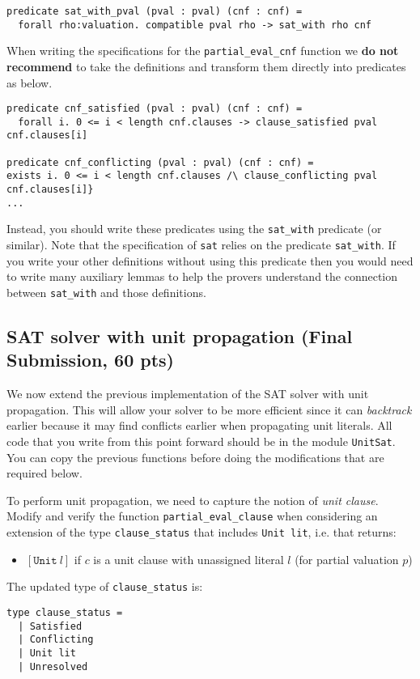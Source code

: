 \documentclass[11pt]{article}
\begin{document}
\begin{lstlisting}
predicate sat_with_pval (pval : pval) (cnf : cnf) =
  forall rho:valuation. compatible pval rho -> sat_with rho cnf
\end{lstlisting}

When writing the specifications for the \texttt{partial\_eval\_cnf} function we \textbf{do not recommend} to take the definitions and transform them directly into predicates as below.

\begin{lstlisting}
predicate cnf_satisfied (pval : pval) (cnf : cnf) = 
  forall i. 0 <= i < length cnf.clauses -> clause_satisfied pval cnf.clauses[i] 

predicate cnf_conflicting (pval : pval) (cnf : cnf) = 
exists i. 0 <= i < length cnf.clauses /\ clause_conflicting pval cnf.clauses[i]}
...
\end{lstlisting}

Instead, you should write these predicates using the \texttt{sat\_with} predicate (or similar). Note that the specification of \texttt{sat} relies on the predicate \texttt{sat\_with}. If you write your other definitions without using this predicate then you would need to write many auxiliary lemmas to help the provers understand the connection between \texttt{sat\_with} and those definitions.


\subsection{SAT solver with unit propagation (Final Submission, 60 pts)}

We now extend the previous implementation of the SAT solver with unit propagation. This will allow your solver to be more efficient since it can \emph{backtrack} earlier because it may find conflicts earlier when propagating unit literals. All code that you write from this point forward should be in the module \texttt{UnitSat}. You can copy the previous functions before doing the modifications that are required below.

\begin{task}[5 pts]
To perform unit propagation, we need to capture the notion of \emph{unit clause}. Modify and verify the function \verb|partial_eval_clause| when considering an extension of the type \texttt{clause\_status} that includes \texttt{Unit lit}, i.e. that returns:
\begin{itemize}
\item $[\texttt{Unit}\ l]$ if $c$ is a unit clause with unassigned literal $l$ (for partial valuation $p$)
\end{itemize}

The updated type of \texttt{clause\_status} is:
\begin{lstlisting}
type clause_status =
  | Satisfied
  | Conflicting
  | Unit lit
  | Unresolved
\end{lstlisting}
\end{task}
\end{document}
